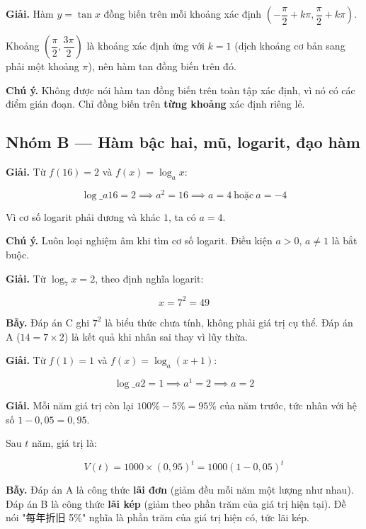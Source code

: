 \documentclass[11pt, a4paper]{article}
\begin{document}
\begin{dapan}[13 — Đáp án A]
\textbf{Giải.} Hàm $y = \tan x$ đồng biến trên mỗi khoảng xác định $\left(-\dfrac{\pi}{2}+k\pi, \dfrac{\pi}{2}+k\pi\right)$.

Khoảng $\left(\dfrac{\pi}{2}, \dfrac{3\pi}{2}\right)$ là khoảng xác định ứng với $k = 1$ (dịch khoảng cơ bản sang phải một khoảng $\pi$), nên hàm tan đồng biến trên đó.

\textbf{Chú ý.} Không được nói hàm tan đồng biến trên toàn tập xác định, vì nó có các điểm gián đoạn. Chỉ đồng biến trên \textbf{từng khoảng} xác định riêng lẻ.
\end{dapan}

\subsection*{Nhóm B — Hàm bậc hai, mũ, logarit, đạo hàm}

\begin{dapan}[14 — Đáp án C]
\textbf{Giải.} Từ $f(16) = 2$ và $f(x) = \log_a x$:

$$\log\_a 16 = 2 \implies a^2 = 16 \implies a = 4 \ \text{hoặc} \ a = -4$$

Vì cơ số logarit phải dương và khác $1$, ta có $a = 4$.

\textbf{Chú ý.} Luôn loại nghiệm âm khi tìm cơ số logarit. Điều kiện $a > 0$, $a \neq 1$ là bắt buộc.
\end{dapan}

\begin{dapan}[15 — Đáp án B]
\textbf{Giải.} Từ $\log_7 x = 2$, theo định nghĩa logarit:

$$x = 7^2 = 49$$

\textbf{Bẫy.} Đáp án C ghi $7^2$ là biểu thức chưa tính, không phải giá trị cụ thể. Đáp án A ($14 = 7 \times 2$) là kết quả khi nhân sai thay vì lũy thừa.
\end{dapan}

\begin{dapan}[16 — Đáp án C]
\textbf{Giải.} Từ $f(1) = 1$ và $f(x) = \log_a(x+1)$:

$$\log\_a 2 = 1 \implies a^1 = 2 \implies a = 2$$
\end{dapan}

\begin{dapan}[17 — Đáp án B]
\textbf{Giải.} Mỗi năm giá trị còn lại $100\% - 5\% = 95\%$ của năm trước, tức nhân với hệ số $1 - 0{,}05 = 0{,}95$.

Sau $t$ năm, giá trị là:

$$V(t) = 1000 \times (0{,}95)^t = 1000(1-0{,}05)^t$$

\textbf{Bẫy.} Đáp án A là công thức \textbf{lãi đơn} (giảm đều mỗi năm một lượng như nhau). Đáp án B là công thức \textbf{lãi kép} (giảm theo phần trăm của giá trị hiện tại). Đề nói "每年折旧 5\%" nghĩa là phần trăm của giá trị hiện có, tức lãi kép.
\end{dapan}
\end{document}
